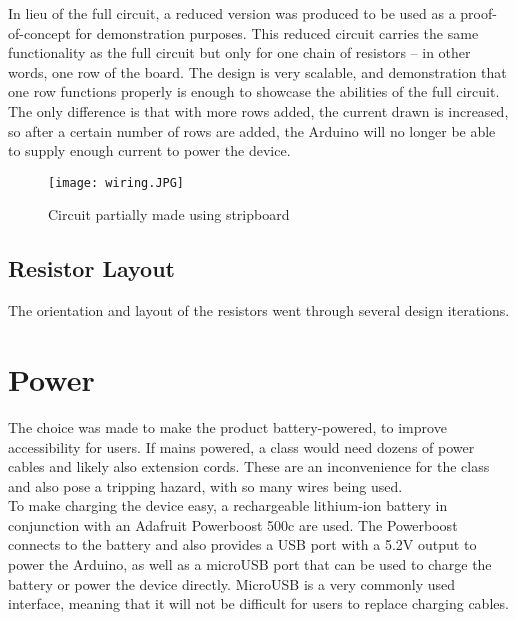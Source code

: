 In lieu of the full circuit, a reduced version was produced to be used as a proof-of-concept for demonstration purposes. This reduced circuit carries the same functionality as the full circuit but only for one chain of resistors -- in other words, one row of the board. The design is very scalable, and demonstration that one row functions properly is enough to showcase the abilities of the full circuit. The only difference is that with more rows added, the current drawn is increased, so after a certain number of rows are added, the Arduino will no longer be able to supply enough current to power the device.


\begin{figure}[H]
	\begin{center}
	\texttt{[image: wiring.JPG]}\\ 
  	\caption{Circuit partially made using stripboard}
    \label{fig:wiring}
    \end{center}
\end{figure}



\subsection {Resistor Layout}

The orientation and layout of the resistors went through several design iterations. 

\section{Power}

The choice was made to make the product battery-powered, to improve accessibility for users. If mains powered, a class would need dozens of power cables and likely also extension cords. These are an inconvenience for the class and also pose a tripping hazard, with so many wires being used.\\

To make charging the device easy, a rechargeable lithium-ion battery in conjunction with an Adafruit Powerboost 500c \cite{PowerBoo78:online} are used. The Powerboost connects to the battery and also provides a USB port with a 5.2V output to power the Arduino, as well as a microUSB port that can be used to charge the battery or power the device directly. MicroUSB  is a very commonly used interface, meaning that it will not be difficult for users to replace charging cables. 


